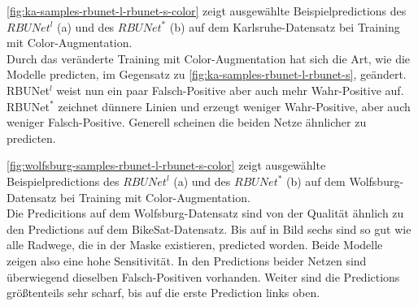 \autoref{fig:ka-samples-rbunet-l-rbunet-s-color} zeigt ausgewählte Beispielpredictions des $RBUNet^l$ (a) und 
des $RBUNet^*$ (b) auf dem Karlsruhe-Datensatz bei Training mit Color-Augmentation. \\
 Durch das veränderte Training mit Color-Augmentation hat sich die Art, wie die Modelle predicten, 
	im Gegensatz zu \autoref{fig:ka-samples-rbunet-l-rbunet-s}, geändert. RBUNet$^l$ weist nun ein paar 
	Falsch-Positive aber auch mehr Wahr-Positive auf. RBUNet$^*$ zeichnet dünnere Linien und erzeugt 
	weniger Wahr-Positive, aber auch weniger Falsch-Positive. Generell scheinen die beiden Netze ähnlicher zu predicten. 

\autoref{fig:wolfsburg-samples-rbunet-l-rbunet-s-color} zeigt ausgewählte Beispielpredictions des $RBUNet^l$ (a) und 
des $RBUNet^*$ (b) auf dem Wolfsburg-Datensatz bei Training mit Color-Augmentation. \\
Die Predicitions auf dem Wolfsburg-Datensatz sind von der Qualität ähnlich zu den Predictions auf dem BikeSat-Datensatz.
Bis auf in Bild sechs sind so gut wie alle Radwege, die in der Maske existieren, predicted worden. 
Beide Modelle zeigen also eine hohe Sensitivität. In den Predictions beider Netzen 
sind überwiegend dieselben Falsch-Positiven vorhanden.
Weiter sind die Predictions größtenteils sehr scharf, bis auf die erste Prediction links oben. 

\pagebreak

